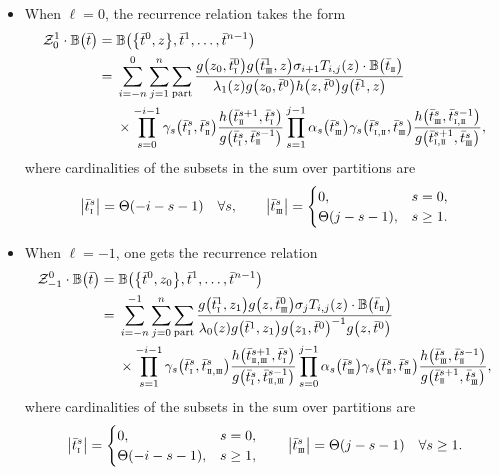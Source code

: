 \documentclass[10pt,a4paper]{amsart}
\newcommand{\so}{\scriptscriptstyle \rm I}
\newcommand{\st}{\scriptscriptstyle \rm I\hspace{-1pt}I}
\newcommand{\sth}{\scriptscriptstyle \rm I\hspace{-1pt}I\hspace{-1pt}I}
\newcommand{\bt}{{\bar t}}
\theoremstyle{definition}
\def\BB{{\mathbb{B}}}
\def\Z{\mathcal{Z}}
\begin{document}
\begin{itemize}
\item When $\ell=0$, the recurrence relation takes the form
\begin{align}
\Z^{1}_{0}\cdot\BB\bigl(\bt\bigr)={}&\BB\bigl(\bigl\{\bt^0,z\bigr\},\bt^{1},\dots,\bt^{n-1}\bigr)\nonumber\\
={}&\sum_{i=-n}^{0}\sum_{j=1}^n\sum_{\rm part}
\frac{g\bigl(z_0,\bt^{0}_{\so}\bigr) g\bigl(\bt^{1}_{\sth},z\bigr) \sigma_{i+1}
T_{i,j}(z)\cdot \BB\bigl(\bt_{\st}\bigr)}
{\lambda_{1}(z) g\bigl(z_0,\bt^{0}\bigr) h\bigl(z,\bt^{0}\bigr)
g\bigl(\bt^{1},z\bigr)}\nonumber\\
&\times
\prod_{s=0}^{-i-1}\gamma_s\bigl(\bt^s_{\so},\bt^s_{\st}\bigr)
\frac{h\bigl(\bt^{s+1}_{\st},\bt^{s}_{\so}\bigr)}{g\bigl(\bt^s_{\so},\bt^{s-1}_{\st}\bigr)}
 \prod_{s=1}^{j-1}\alpha_s\bigl(\bt^s_{\sth}\bigr)\gamma_s\bigl(\bt^s_{{\so},{\st}},\bt^s_{\sth}\bigr)
 \frac{h\bigl(\bt^s_{\sth},\bt^{s-1}_{{\so},{\st}}\bigr)}
 {g\bigl(\bt^{s+1}_{{\so},{\st}},\bt^{s}_{\sth}\bigr)} ,\label{ex3}
\end{align}
where cardinalities of the subsets in the sum over partitions are
\[%
\big|\bt^s_{\so}\big|=\Theta(-i-s-1)\quad \forall s,
\qquad
\big|\bt^s_{\sth}\big|=\begin{cases}
0, &s=0,\\
\Theta(j-s-1), &s\geq 1.
\end{cases}
\]
\item When $\ell=-1$, one gets the recurrence
relation
\begin{align}
\Z^{0}_{-1}\cdot\BB\bigl(\bt\bigr)={}&\BB\bigl(\bigl\{\bt^0,z_0\bigr\},\bt^{1},\dots,\bt^{n-1}\bigr)\nonumber\\
={}&\sum_{i=-n}^{-1}\sum_{j=0}^n\sum_{\rm part}
\frac{g\bigl(\bt^{1}_{\so},z_1\bigr) g\bigl(z,\bt^{0}_{\sth}\bigr) \sigma_j T_{i,j}(z)\cdot \BB\bigl(\bt_{\st}\bigr)}
{\lambda_{0}(z) g\bigl(\bt^{1},z_1\bigr) g\bigl(z_1,\bt^{0}\bigr)^{-1}
g\bigl(z,\bt^{0}\bigr)}\nonumber\\
&\times
\prod_{s=1}^{-i-1}\gamma_s\bigl(\bt^s_{\so},\bt^s_{{\st},{\sth}}\bigr)
\frac{h\bigl(\bt^{s+1}_{{\st},{\sth}},\bt^{s}_{\so}\bigr)}
{g\bigl(\bt^s_{\so},\bt^{s-1}_{{\st},{\sth}}\bigr)}
 \prod_{s=0}^{j-1}\alpha_s\bigl(\bt^s_{\sth}\bigr)\gamma_s\bigl(\bt^s_{{\st}},\bt^s_{\sth}\bigr)
 \frac{h\bigl(\bt^s_{\sth},\bt^{s-1}_{{\st}}\bigr)}{g\bigl(\bt^{s+1}_{{\st}},\bt^{s}_{\sth}\bigr)} ,\label{ex4}
\end{align}
where cardinalities of the subsets in the sum over partitions are
\[%
\big|\bt^s_{\so}\big|=\begin{cases}
0,&s=0,\\
\Theta(-i-s-1), &s\geq 1,
\end{cases}
\qquad
\big|\bt^s_{\sth}\big|=
\Theta(j-s-1)\quad \forall s\geq 1.
\]
\end{itemize}
\end{document}

